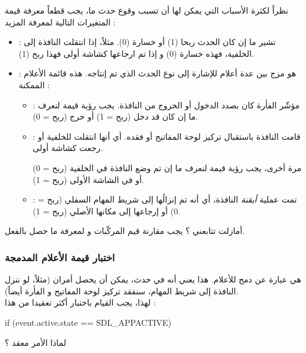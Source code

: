 نظراً لكثرة الأسباب التي يمكن لها أن تسبب وقوع حدث ما، يجب قطعاً معرفة قيمة المتغيرات التالية لمعرفة المزيد :

\begin{itemize}
	\item {} :
تشير ما إن كان الحدث ربحا (1) أو خسارة (0). مثلاً، إذا انتقلت النافذة إلى الخلفية، فهذه خسارة (0) و إذا تم ارجاعها كشاشة أولى فهذا ربح (1).
	\item {} :
	هو مزج بين عدة أعلام للإشارة إلى نوع الحدث الذي تم إنتاجه. هذه قائمة الأعلام الممكنة :
	\begin{itemize}
		\item {} :
		مؤشّر الفأرة كان بصدد الدخول أو الخروج من النافذة. 
		يجب رؤية قيمة
		لنعرف ما إن كان قد دخل (ربح = 1) أو خرج (ربح = 0).
		\item {} :
		قامت النافذة باستقبال تركيز لوحة المفاتيح أو فقده. أي أنها انتقلت للخلفية أو رجعت كشاشة أولى.
		
		مرة أخرى، يجب رؤية قيمة 
		لنعرف ما إن تم وضع النافذة في الخلفية (ربح = 0) أو في الشاشة الأولى (ربح = 1).
		\item {} :
		تمت عملية
		\textit{أيقنة}
		النافذة، أي أنه تم إنزالُها إلى شريط المهام السفلي (ربح = 0) أو إرجاعها إلى مكانها الأصلي (ربح = 1).
	\end{itemize}
\end{itemize}

أمازلت تتابعني ؟ يجب مقارنة قيم المركّبات
و
لمعرفة ما حصل بالفعل.

\subsubsection{اختبار قيمة الأعلام المدمجة}

هي عبارة عن دمج للأعلام. هذا يعني أنه في حدث، يمكن أن يحصل أمران (مثلاً، لو ننزل النافذة إلى شريط المهام، سنفقد تركيز لوحة المفاتيح و الفأرة أيضاً).\\
لهذا، يجب القيام باختبار أكثر تعقيدا من هذا :

\begin{Csource}
if (event.active.state == SDL_APPACTIVE)
\end{Csource}

\begin{question}
لماذا الأمر معقد ؟
\end{question}

